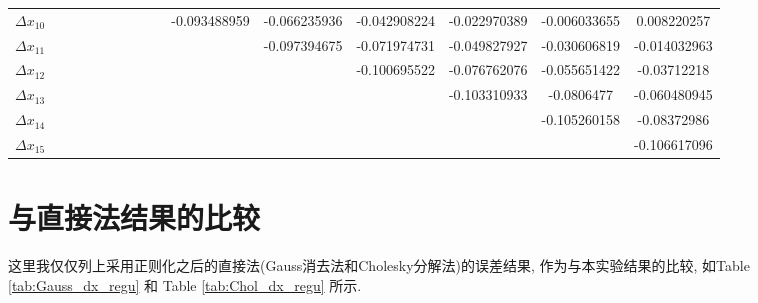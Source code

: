 \documentclass[a4paper]{article}
\begin{document}
\begin{CJK*}{GBK}{song}
\begin{center}
\begin{table*}[!htbp]
{\begin{threeparttable}[!htpb]
\begin{tabular}{ccccc ccccc ccccc}
$\Delta x_{10}$	&		&		&		&		&		&		&		&		&	-0.093488959	&	-0.066235936	&	-0.042908224	&	-0.022970389	&	-0.006033655	&	0.008220257	\\
$\Delta x_{11}$	&		&		&		&		&		&		&		&		&		&	-0.097394675	&	-0.071974731	&	-0.049827927	&	-0.030606819	&	-0.014032963	\\
$\Delta x_{12}$	&		&		&		&		&		&		&		&		&		&		&	-0.100695522	&	-0.076762076	&	-0.055651422	&	-0.03712218	\\
$\Delta x_{13}$	&		&		&		&		&		&		&		&		&		&		&		&	-0.103310933	&	-0.0806477	&	-0.060480945	\\
$\Delta x_{14}$	&		&		&		&		&		&		&		&		&		&		&		&		&	-0.105260158	&	-0.08372986	\\
$\Delta x_{15}$	&		&		&		&		&		&		&		&		&		&		&		&		&		&	-0.106617096	\\
\bottomrule
\end{tabular}
\end{threeparttable}}%
\end{table*}
\end{center}



\section{与直接法结果的比较}
这里我仅仅列上采用正则化之后的直接法(Gauss消去法和Cholesky分解法)的误差结果, 作为与本实验结果的比较, 如Table \ref{tab:Gauss_dx_regu} 和 Table \ref{tab:Chol_dx_regu} 所示.



\end{CJK*}
\end{document}
